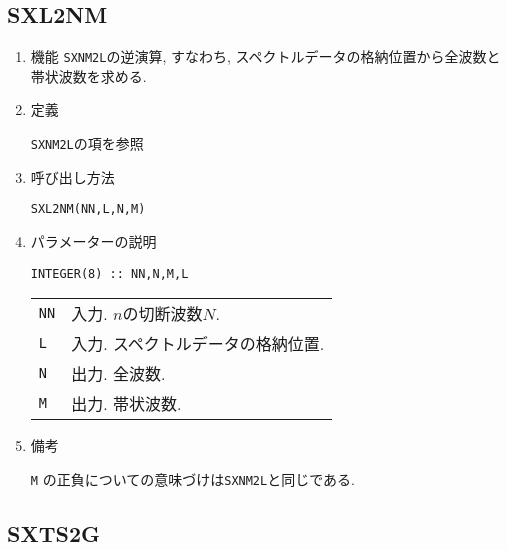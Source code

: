 \documentclass[a4j]{jsarticle}
\begin{document}

\subsection{SXL2NM}

\begin{enumerate}

\item 機能 
\texttt{SXNM2L}の逆演算, すなわち, スペクトルデータの格納位置から全波数と
帯状波数を求める.

\item 定義

\texttt{SXNM2L}の項を参照

\item 呼び出し方法 
    
\texttt{SXL2NM(NN,L,N,M)}
  
\item パラメーターの説明

\begin{verbatim}
INTEGER(8) :: NN,N,M,L  
\end{verbatim}    

\begin{tabular}{ll}
\texttt{NN} & 入力. $n$の切断波数$N$.\\
\texttt{L} & 入力. スペクトルデータの格納位置.\\
\texttt{N} & 出力. 全波数.\\
\texttt{M} & 出力. 帯状波数.
\end{tabular}

\item 備考

 \texttt{M} の正負についての意味づけは\texttt{SXNM2L}と同じである.

\end{enumerate}


\subsection{SXTS2G}
\end{document}
